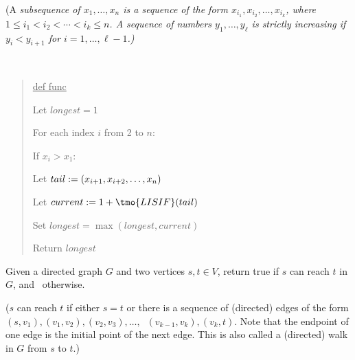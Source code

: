 \documentclass[10pt]{article}
\newcommand{\parof}[1]{\mleft( #1 \mright)}
\begin{document}
(A \it{subsequence} of \( x_1, \ldots, x_n \) is a sequence of the form \( x_{i_1}, x_{i_2}, \ldots, x_{i_k} \), where \( 1\leq i_1<i_2<\cdots<i_k\leq n \). A sequence of numbers \( y_1, \ldots, y_\ell \) is strictly increasing if \( y_i < y_{i+1} \) for \( i = 1, \ldots, \ell-1 \).)

\begin{solution}\ %
\begin{quote}%
\noindent\ul{def func } %

%

\begin{steps}
  \item Let \( longest = 1 \)
  \item For each index \( i \) from 2 to \( n \):
    \begin{steps}
    \item If \( x_i > x_1 \):
      \begin{steps}
      \item Let \( tail := \parof{x_{i+1}, x_{i+2}, \ldots, x_n} \)
      \item Let \( current := 1 + \tmo{LISIF}(tail) \)
      \item Set \( longest = \max(longest, current) \)
      \end{steps}
    \end{steps}
    \item Return \( longest \)
  \end{steps}
\end{quote}%
\end{solution}%
\pagebreak

Given a directed graph \( G \) and two vertices \( s, t \in V \), return true if \( s \) can reach \( t \) in \( G \), and \boolF~otherwise.

(\( s \) can reach \( t \) if either \( s = t \) or there is a sequence of (directed) edges of the
form \( (s, v_1), (v_1, v_2), (v_2, v_3), \ldots, \) \( \ (v_{k-1}, v_k), (v_k, t) \). Note that the endpoint of one
edge is the initial point of the next edge. This is also called a (directed) walk in \( G \) from \( s \) to \( t \).)
\end{document}

